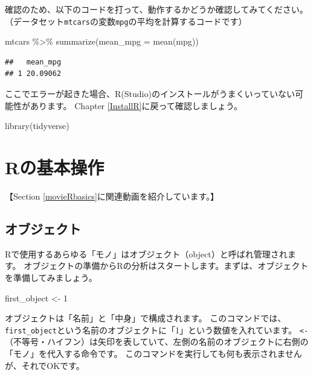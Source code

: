 \documentclass[
]{book}
\newenvironment{Shaded}{\begin{snugshade}}{\end{snugshade}}
\newcommand{\AttributeTok}[1]{\textcolor[rgb]{0.77,0.63,0.00}{#1}}
\newcommand{\DecValTok}[1]{\textcolor[rgb]{0.00,0.00,0.81}{#1}}
\newcommand{\FunctionTok}[1]{\textcolor[rgb]{0.00,0.00,0.00}{#1}}
\newcommand{\NormalTok}[1]{#1}
\newcommand{\OtherTok}[1]{\textcolor[rgb]{0.56,0.35,0.01}{#1}}
\newcommand{\SpecialCharTok}[1]{\textcolor[rgb]{0.00,0.00,0.00}{#1}}
\begin{document}
確認のため、以下のコードを打って、動作するかどうか確認してみてください。
（データセット\texttt{mtcars}の変数\texttt{mpg}の平均を計算するコードです）

\begin{Shaded}
\begin{Highlighting}[]
\NormalTok{mtcars }\SpecialCharTok{\%\textgreater{}\%} \FunctionTok{summarize}\NormalTok{(}\AttributeTok{mean\_mpg =} \FunctionTok{mean}\NormalTok{(mpg))}
\end{Highlighting}
\end{Shaded}

\begin{verbatim}
##   mean_mpg
## 1 20.09062
\end{verbatim}

ここでエラーが起きた場合、R(Studio)のインストールがうまくいっていない可能性があります。
Chapter \ref{InstallR}に戻って確認しましょう。

\begin{Shaded}
\begin{Highlighting}[]
\FunctionTok{library}\NormalTok{(tidyverse)}
\end{Highlighting}
\end{Shaded}

\hypertarget{Rbasics}{%
\chapter{Rの基本操作}\label{Rbasics}}

【Section \ref{movieRbasics}に関連動画を紹介しています。】

\hypertarget{ux30aaux30d6ux30b8ux30a7ux30afux30c8}{%
\section{オブジェクト}\label{ux30aaux30d6ux30b8ux30a7ux30afux30c8}}

Rで使用するあらゆる「モノ」はオブジェクト（object）と呼ばれ管理されます。
オブジェクトの準備からRの分析はスタートします。まずは、オブジェクトを準備してみましょう。

\begin{Shaded}
\begin{Highlighting}[]
\NormalTok{first\_object }\OtherTok{\textless{}{-}} \DecValTok{1} 
\end{Highlighting}
\end{Shaded}

オブジェクトは「名前」と「中身」で構成されます。
このコマンドでは、\texttt{first\_object}という名前のオブジェクトに「1」という数値を入れています。
\texttt{\textless{}-}（不等号・ハイフン）は矢印を表していて、左側の名前のオブジェクトに右側の「モノ」を代入する命令です。
このコマンドを実行しても何も表示されませんが、それでOKです。
\end{document}
